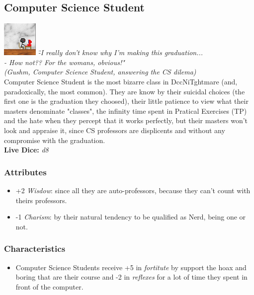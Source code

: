 \documentclass[ letterpaper,12pt]{article}
\begin{document}
\subsection{Computer Science Student}
\includegraphics{../data/classes/Img/dcc.png}
{\it 
\"-I really don't know why I'm making this graduation...\\
- How not?? For the womans, obvious!"\\
(Gushm, Computer Science Student, answering the CS dilema)}\\

Computer Science Student is the most bizarre class in DccNiTghtmare (and,
paradoxically, the most common). They are know by their suicidal choices (the
first one is the graduation they choosed), their little patience to view what
their masters denominate "classes", the infinity time spent in Pratical
Exercises (TP) and the hate when they percept that it works perfectly, but their
masters won't look and appraise it, since CS professors are displicents and
without any compromise with the graduation.\\

{\bf Live Dice:} {\it d8}

\subsubsection{Attributes}
\begin{itemize}
\item{+2 {\it Wisdow}: since all they are auto-professors, because they can't count with theirs professors.}
\item{-1 {\it Charism}: by their natural tendency to be qualified as Nerd, being one or not.}
\end{itemize}

\subsubsection{Characteristics}
\begin{itemize}
\item{Computer Science Students receive +5 in {\it fortitute} by support the hoax and boring that are their course and -2 in {\it reflexes} for a lot of time they spent in front of the computer.}
\end{itemize}
\end{document}
